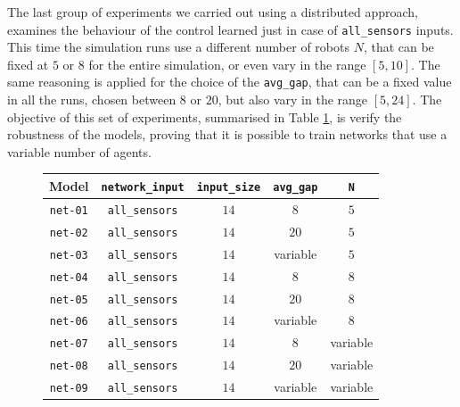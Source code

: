 The last group of experiments we carried out using a distributed approach, 
examines the behaviour of the control learned just in case of \texttt{all\_sensors} 
inputs. This time the simulation runs use a different number of robots $N$, that 
can be fixed at $5$ or $8$ for the entire simulation, or even vary in the range 
$[5, 10]$. The same reasoning is applied for the choice of the \texttt{avg\_gap}, 
that can be a fixed value in all the runs, chosen between $8$ or $20$, but also 
vary in the range $[5, 24]$. 
The objective of this set of experiments, summarised in Table \ref{tab:modeldist}, 
is verify the robustness of the models, proving that it is possible to train networks 
that use a variable number of agents. 
\begin{figure}[!htb]
	\centering
	\begin{tabular}{ccccc}
		\toprule
		\textbf{Model} \quad & \textbf{\texttt{network\_input}} & 
		\textbf{\texttt{input\_size}} & \textbf{\texttt{avg\_gap}} & \textbf{\texttt{N}}\\
		\midrule
		\texttt{net-01} 	& \texttt{all\_sensors}		&  $14$  &  $8$		 &	 $5$ \\
		\texttt{net-02} 	& \texttt{all\_sensors}		&  $14$  &  $20$		&	$5$ \\
		\texttt{net-03} 	& \texttt{all\_sensors}		&  $14$  &  variable	&	$5$ \\
		\texttt{net-04} 	& \texttt{all\_sensors}	  	&  $14$  &  $8$			 &	  $8$ \\
		\texttt{net-05} 	& \texttt{all\_sensors}	  	&  $14$  &  $20$   		&	 $8$ \\
		\texttt{net-06} 	& \texttt{all\_sensors}	  	&  $14$  &  variable	&	 $8$ \\
		\texttt{net-07} 	& \texttt{all\_sensors}	  	&  $14$  &  $ 8$		  &	 variable\\
		\texttt{net-08} 	& \texttt{all\_sensors}	  	&  $14$  &  $20$		 &	variable\\
		\texttt{net-09} 	& \texttt{all\_sensors}	  	&  $14$  &  variable	 &	variable\\
		\bottomrule
	\end{tabular}
	\label{tab:modeldist}
\end{figure}


